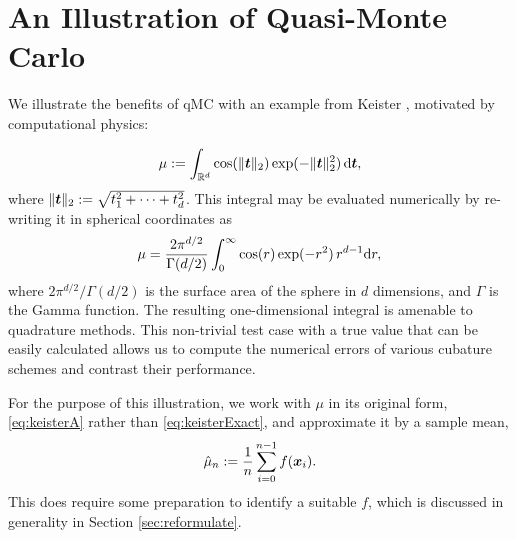 \documentclass{svproc}
\begin{document}
%
\section{An Illustration of Quasi-Monte Carlo} \label{sec:practice}

We illustrate the benefits of qMC with an example from Keister \cite{Kei96}, motivated by computational physics:

\begin{equation}\label{eq:keisterA}
	\mu := \int_{\mathbb{R}^d} \cos(\lVert {\boldsymbol{t}} \rVert_2) \exp(-\lVert {\boldsymbol{t}} \rVert_2^2) \, {\mathrm{d}} {\boldsymbol{t}},
\end{equation}
where $\lVert {\boldsymbol{t}} \rVert_2 := \sqrt{t_1^2 + \cdots + t_d^2}$.  This integral may be evaluated numerically by re-writing it in spherical coordinates as
\begin{equation}\label{eq:keisterExact}
	\mu = \frac{2 \pi^{d/2}}{\Gamma(d/2)}\int_{0}^{\infty} \cos(r) \exp(-r^2) \, r^{d-1} {\mathrm{d}} r,
\end{equation}
where $2 \pi^{d/2}/\Gamma(d/2)$ is the surface area of the sphere in $d$ dimensions, and $\Gamma$ is the Gamma function.  The resulting one-dimensional integral is amenable to quadrature methods.  This non-trivial test case with a true value that can be easily calculated allows us to compute the numerical errors of various cubature schemes and contrast their performance.

For the purpose of this illustration, we work with $\mu$ in its original form, \eqref{eq:keisterA} rather than \eqref{eq:keisterExact}, and approximate it by a sample mean,
\begin{equation} \label{eq:sample_mean}
	\hat{\mu}_n := \frac 1n \sum_{i=0}^{n-1} f({\boldsymbol{x}}_i).
\end{equation}
This does require some preparation to identify a suitable $f$, which is discussed in generality in Section \ref{sec:reformulate}.
\end{document}
